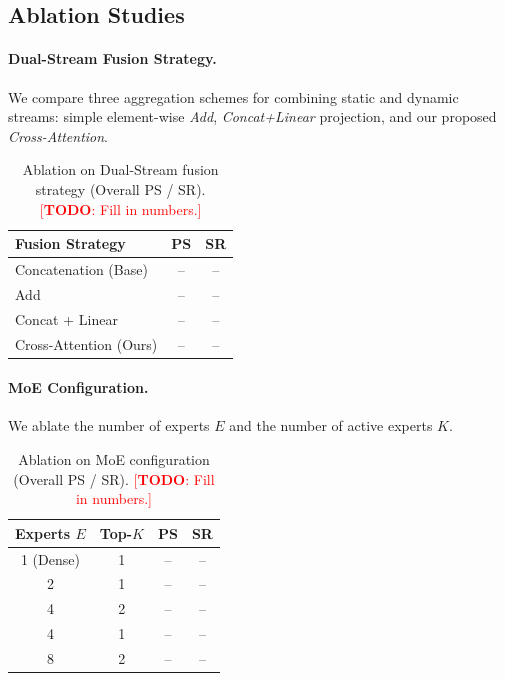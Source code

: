 \documentclass[10pt,twocolumn]{article}
\newcommand{\TODO}[1]{\textcolor{red}{[\textbf{TODO}: #1]}}
\begin{document}
\subsection{Ablation Studies}
\label{sec:exp:ablation}

\paragraph{Dual-Stream Fusion Strategy.}
We compare three aggregation schemes for combining static and dynamic streams:
simple element-wise \emph{Add}, \emph{Concat+Linear} projection, and our
proposed \emph{Cross-Attention}.

\begin{table}[h]
  \centering
  \caption{Ablation on Dual-Stream fusion strategy (Overall PS / SR).
    \TODO{Fill in numbers.}}
  \label{tab:abl_ds}
  \begin{tabular}{lcc}
    \toprule
    Fusion Strategy & PS & SR \\
    \midrule
    Concatenation (Base) & -- & -- \\
    Add                  & -- & -- \\
    Concat + Linear      & -- & -- \\
    Cross-Attention (Ours) & -- & -- \\
    \bottomrule
  \end{tabular}
\end{table}

\paragraph{MoE Configuration.}
We ablate the number of experts $E$ and the number of active experts $K$.

\begin{table}[h]
  \centering
  \caption{Ablation on MoE configuration (Overall PS / SR).
    \TODO{Fill in numbers.}}
  \label{tab:abl_moe}
  \begin{tabular}{cccc}
    \toprule
    Experts $E$ & Top-$K$ & PS & SR \\
    \midrule
    1 (Dense)  & 1 & -- & -- \\
    2          & 1 & -- & -- \\
    4          & 2 & -- & -- \\
    4          & 1 & -- & -- \\
    8          & 2 & -- & -- \\
    \bottomrule
  \end{tabular}
\end{table}
\end{document}
